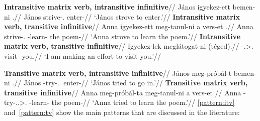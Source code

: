 \pex\label{ex:itv-inf}
    \a
    \begingl
        \glpreamble \textbf{Intransitive matrix verb, intransitive infinitive}//
        \gla 	János igyekez-ett \nogloss{[\tss{\Inf}} bemen-ni \nogloss{]}.//
        \glb 	János strive-\Tsg.\Pst{} enter-\Inf{}//
        \glft 	\enquote*{János strove to enter.}//
    \endgl
    \a
    \begingl
        \glpreamble \textbf{Intransitive matrix verb, transitive infinitive}//
        \gla 	Anna igyekez-ett \nogloss{[\tss{\Inf}} meg-tanul-ni a vers-et \nogloss{]}.//
        \glb 	Anna strive-\Tsg.\Pst{} \Vm-learn-\Inf{} the poem-\Acc{}//
        \glft 	\enquote*{Anna strove to learn the poem.}//
    \endgl
    \a
    \begingl
        \glpreamble \textbf{Intransitive matrix verb, transitive infinitive}//
        \gla 	Igyekez-lek meglátogat-ni (téged).//
        -\Fsg.\Sbj>\Second.\Obj{} visit-\Inf{} you.\Acc{}//
        \glft 	\enquote*{I am making an effort to visit you.}//
    \endgl
\xe

\pex\label{ex:tv-inf}
    \a
    \begingl
        \glpreamble \textbf{Transitive matrix verb, intransitive infinitive}//
        \gla 	János meg-próbál-t \nogloss{[\tss{\Inf}} bemen-ni \nogloss{]}.//
        \glb 	János \Vm-try-\Pst.\Tsg.\Sbj{} enter-\Inf{}//
        \glft 	\enquote*{János tried to go in.}//
    \endgl
    \a
    \begingl
        \glpreamble \textbf{Transitive matrix verb, transitive infinitive}//
        \gla 	Anna meg-próbál-ta \nogloss{[\tss{\Inf}} meg-tanul-ni a vers-et \nogloss{].}//
        \glb 	Anna \Vm-try-\Pst.\Tsg.\Sbj>\Third.\Obj{} \Vm-learn-\Inf{} the poem-\Acc//
        \glft 	\enquote*{Anna tried to learn the poem.}//
    \endgl
\xe
\ref{pattern:itv} and~\ref{pattern:tv} show the main patterns that are
discussed in the literature:

